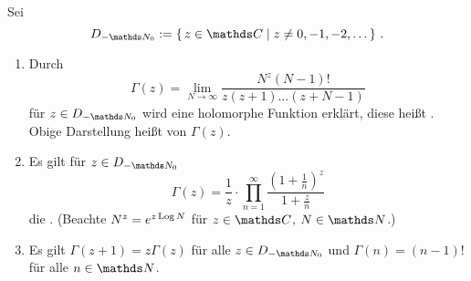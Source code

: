\begin{satz}\label{satz:gamma-fkt}
Sei
\[
	D_{-\NN_0}
	:= \Set{z\in\CC \mid z\not= 0, -1, -2, \ldots}
	\,.
\]
\begin{enumerate}
\item Durch
\[
	\Gamma(z)
	= \lim _ {N\to\infty} \frac{N^z(N-1)!}{z(z+1)\ldots(z+N-1)}
\]
für $z\in D_{-\NN_0}$ wird eine holomorphe Funktion erklärt, diese heißt . Obige Darstellung heißt  von $\Gamma(z)$.

\item Es gilt für $z\in D_{-\NN_0}$
\[
	\Gamma(z) = \frac{1}{z} \cdot \prod_{n=1}^\infty \frac{\left(1+\frac{1}{n}\right)^z}{1+\frac{z}{n}}
\]
die .
(Beachte $N^z = e^{z\operatorname{Log} N}$ für $z\in\CC$, $N \in \NN$.)
\item Es gilt $\Gamma(z+1) = z\Gamma(z)$ für alle $z\in D_{-\NN_0}$ und $\Gamma(n) = (n-1)!$ für alle $n\in\NN$.
\end{enumerate}
\end{satz}

